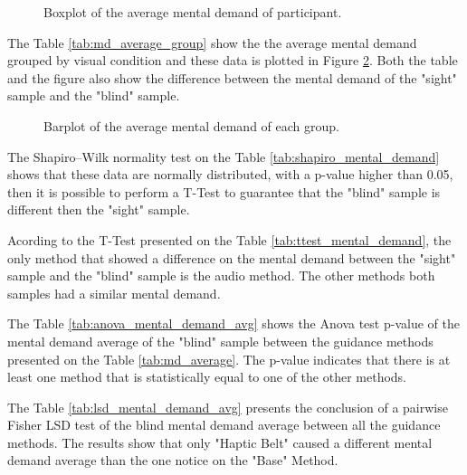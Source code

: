 

\begin{figure}[!htb]
    \centering
    \resizebox{0.6\linewidth}{!}{
    
    }
    \caption{Boxplot of the average mental demand of participant.}
    \label{fig:boxplot_md_scene}
\end{figure}

The Table \ref{tab:md_average_group} show the the average mental demand grouped by visual condition and these data is plotted in Figure \ref{fig:barplot_md_global}. Both the table and the figure also show the difference between the mental demand of the "sight" sample and the "blind" sample.



\begin{figure}[!htb]
    \centering
    \resizebox{0.6\linewidth}{!}{
    
    }
    \caption{Barplot of the average mental demand of each group.}
    \label{fig:barplot_md_global}
\end{figure}

The Shapiro–Wilk normality test on the Table \ref{tab:shapiro_mental_demand} shows that these data are normally distributed, with a p-value higher than 0.05, then it is possible to perform a T-Test to guarantee that the "blind" sample is different then the "sight" sample.



Acording to the T-Test presented on the Table \ref{tab:ttest_mental_demand}, the only method that showed a difference on the mental demand between the "sight" sample and the "blind" sample is the audio method. The other methods both samples had a similar mental demand.



The Table \ref{tab:anova_mental_demand_avg} shows the Anova test p-value of the mental demand average of the "blind" sample between the guidance methods presented on the Table \ref{tab:md_average}. The p-value indicates that there is at least one method that is statistically equal to one of the other methods.



The Table \ref{tab:lsd_mental_demand_avg} presents the conclusion of a pairwise Fisher LSD test of the blind mental demand average between all the guidance methods. The results show that only "Haptic Belt" caused a different mental demand average than the one notice on the "Base" Method.

